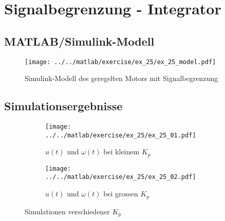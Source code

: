 \section{Signalbegrenzung - Integrator}

\subsection{MATLAB/Simulink-Modell}

\begin{figure}[h!]
	\centering
	\texttt{[image: ../../matlab/exercise/ex\_25/ex\_25\_model.pdf]}
	\caption{Simulink-Modell des geregelten Motors mit Signalbegrenzung}
\end{figure}

\subsection{Simulationsergebnisse}
\begin{figure}[h!]
	\centering
	\begin{subfigure}{0.45\textwidth}
		\texttt{[image: ../../matlab/exercise/ex\_25/ex\_25\_01.pdf]}
		\caption{$u(t)$ und $\omega(t)$ bei kleinem $K_p$}
	\end{subfigure}
	\hfill{}
	\begin{subfigure}{0.45\textwidth}
		\texttt{[image: ../../matlab/exercise/ex\_25/ex\_25\_02.pdf]}
		\caption{$u(t)$ und $\omega(t)$ bei grossen $K_p$}
	\end{subfigure}
	\caption{Simulationen verschiedener $K_p$}
\end{figure}
